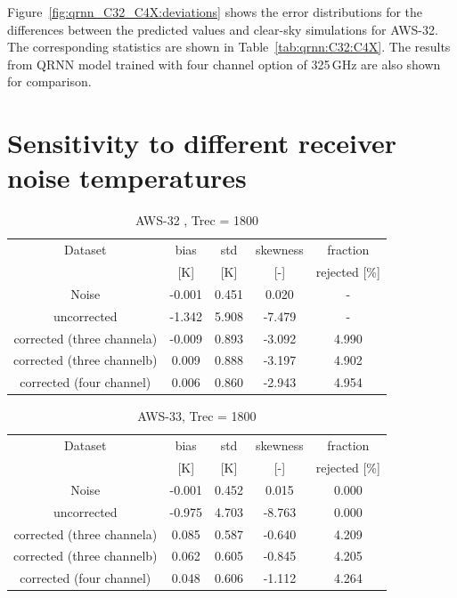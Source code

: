 \documentclass[12pt]{article}
\begin{document}
Figure~\ref{fig:qrnn_C32_C4X:deviations} shows the error distributions for the differences between the predicted values and clear-sky simulations for AWS-32. The corresponding statistics are shown in Table~\ref{tab:qrnn:C32:C4X}. The results from QRNN model trained with four channel option of 325\,GHz are also shown for comparison.  

\section{Sensitivity to different receiver noise temperatures}

%
\begin{table}[!p]
	\centering
	\begin{tabular}[b]{c|c|c|c|c}
		Dataset  		  &   bias &   std &   skewness & fraction  \\
		&   [K]  &   [K] & [-] & rejected [\%]\\
		\hline
	Noise                      & -0.001 & 0.451 &              0.020 &      - \\
	uncorrected                & -1.342 & 5.908 &             -7.479 &      - \\
	corrected (three channela) & -0.009 & 0.893 &             -3.092 &      4.990 \\
    corrected (three channelb) &  0.009 & 0.888 &             -3.197 &      4.902 \\	
	corrected (four channel)   &  0.006 & 0.860 &             -2.943 &      4.954 \\
		\hline
	\end{tabular}
	\caption{ AWS-32 , Trec = 1800}
	\label{tab:qrnn:C36}
\end{table}

\begin{table}[!p]
	\centering
	\begin{tabular}[b]{c|c|c|c|c}
		Dataset  		  &   bias &   std &   skewness & fraction  \\
		&   [K]  &   [K] & [-] & rejected [\%]\\
		\hline
	Noise                      & -0.001 & 0.452 &              0.015 &      0.000 \\
	uncorrected                & -0.975 & 4.703 &             -8.763 &      0.000 \\
	corrected (three channela) &  0.085 & 0.587 &             -0.640 &      4.209 \\
	corrected (three channelb) &  0.062 & 0.605 &             -0.845 &      4.205 \\
	corrected (four channel)   &  0.048 & 0.606 &             -1.112 &      4.264 \\
		\hline
	\end{tabular}
	\caption{ AWS-33, Trec = 1800 }
	\label{tab:qrnn:C36}
\end{table}
\end{document}
